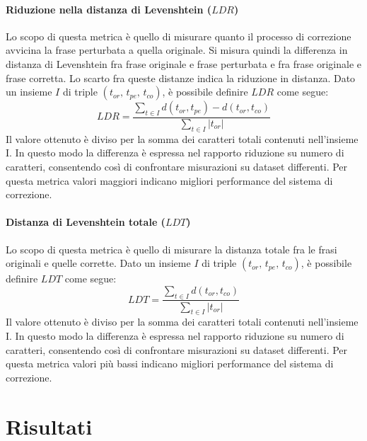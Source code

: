 \paragraph{Riduzione nella distanza di Levenshtein ($LDR$)}
Lo scopo di questa metrica è quello di misurare quanto il processo di correzione avvicina la frase perturbata a quella originale. Si misura quindi la differenza in distanza di Levenshtein fra frase originale e frase perturbata e fra frase originale e frase corretta. Lo scarto fra queste distanze indica la riduzione in distanza. Dato un insieme $I$ di triple $(\text{$t_{or}$, $t_{pe}$, $t_{co}$})$, è possibile definire $LDR$ come segue:
\begin{equation}
LDR = \frac{
\sum_{t \in I}d(t_{or},t_{pe}) - d(t_{or},t_{co})}{\sum_{t \in I}|t_{or}|}
\end{equation}
Il valore ottenuto è diviso per la somma dei caratteri totali contenuti nell'insieme I. In questo modo la differenza è espressa nel rapporto riduzione su numero di caratteri, consentendo così di confrontare misurazioni su dataset differenti. Per questa metrica valori maggiori indicano migliori performance del sistema di correzione.


\paragraph{Distanza di Levenshtein totale ($LDT$)}
Lo scopo di questa metrica è quello di misurare la distanza totale fra le frasi originali e quelle corrette. Dato un insieme $I$ di triple $(\text{$t_{or}$, $t_{pe}$, $t_{co}$})$, è possibile definire $LDT$ come segue:
\begin{equation}
LDT = \frac{
\sum_{t \in I}d(t_{or},t_{co})}{\sum_{t \in I}|t_{or}|}
\end{equation}
Il valore ottenuto è diviso per la somma dei caratteri totali contenuti nell'insieme I. In questo modo la differenza è espressa nel rapporto riduzione su numero di caratteri, consentendo così di confrontare misurazioni su dataset differenti. Per questa metrica valori più bassi indicano migliori performance del sistema di correzione.


\section{Risultati}
\label{sec:test_risultati}

